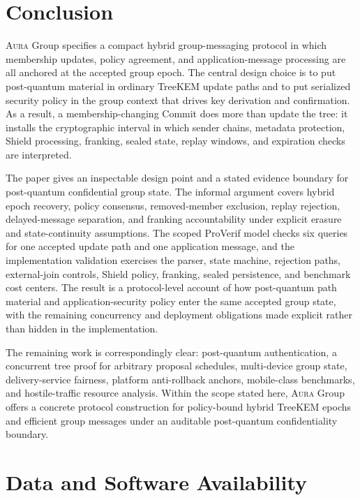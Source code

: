 \documentclass[preprint,12pt]{elsarticle}
\theoremstyle{definition}
\newcommand{\tech}[1]{\textnormal{#1}}
\newcommand{\Aura}{\textsc{Aura}}
\newcommand{\TreeKEM}{\tech{TreeKEM}}
\newcommand{\Shield}{\tech{Shield}}
\newcommand{\ProVerif}{\tech{ProVerif}}
\begin{document}
\section{Conclusion}\label{sec:conclusion}

\Aura{} Group specifies a compact hybrid group-messaging protocol in which
membership updates, policy agreement, and application-message processing are
all anchored at the accepted group epoch. The central design choice is to put
post-quantum material in ordinary \TreeKEM{} update paths and to put serialized
security policy in the group context that drives key derivation and
confirmation. As a result, a membership-changing Commit does more than update
the tree: it installs the cryptographic interval in which sender chains,
metadata protection, \Shield{} processing, franking, sealed state, replay
windows, and expiration checks are interpreted.

The paper gives an inspectable design point and a stated evidence boundary for
post-quantum confidential group state. The informal argument covers hybrid epoch
recovery, policy consensus, removed-member exclusion, replay rejection,
delayed-message separation, and franking accountability under explicit erasure
and state-continuity assumptions. The scoped \ProVerif{} model checks six
queries for one accepted update path and one application message, and the
implementation validation exercises the parser, state machine, rejection paths,
external-join controls, \Shield{} policy, franking, sealed persistence, and
benchmark cost centers. The result is a protocol-level account of how
post-quantum path material and application-security policy enter the same
accepted group state, with the remaining concurrency and deployment obligations
made explicit rather than hidden in the implementation.

The remaining work is correspondingly clear: post-quantum
authentication, a concurrent tree proof for arbitrary proposal schedules,
multi-device group state, delivery-service fairness, platform anti-rollback
anchors, mobile-class benchmarks, and hostile-traffic resource analysis. Within
the scope stated here, \Aura{} Group offers a concrete protocol construction for
policy-bound hybrid TreeKEM epochs and efficient group messages under an
auditable post-quantum confidentiality boundary.

\section*{Data and Software Availability}
\end{document}
